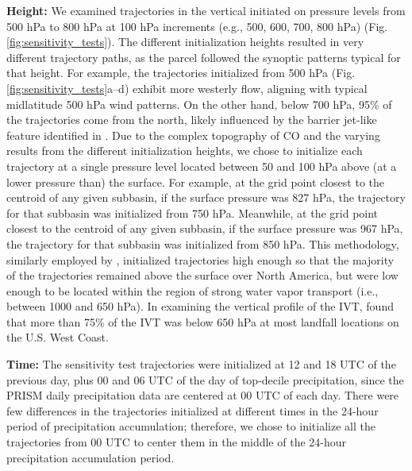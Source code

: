 \documentclass[draft]{agujournal2019}
\begin{document}
\textbf{Height:} We examined trajectories in the vertical initiated on pressure levels from 500 hPa to 800 hPa at 100 hPa increments (e.g., 500, 600, 700, 800 hPa) (Fig. \ref{fig:sensitivity_tests}). The different initialization heights resulted in very different trajectory paths, as the parcel followed the synoptic patterns typical for that height. For example, the trajectories initialized from 500 hPa (Fig. \ref{fig:sensitivity_tests}a--d) exhibit more westerly flow, aligning with typical midlatitude 500 hPa wind patterns. On the other hand, below 700 hPa, 95\% of the trajectories come from the north, likely influenced by the barrier jet-like feature identified in . Due to the complex topography of CO and the varying results from the different initialization heights, we chose to initialize each trajectory at a single pressure level located between 50 and 100 hPa above (at a lower pressure than) the surface. For example, at the grid point closest to the centroid of any given subbasin, if the surface pressure was 827 hPa, the trajectory for that subbasin was initialized from 750 hPa. Meanwhile, at the grid point closest to the centroid of any given subbasin, if the surface pressure was 967 hPa, the trajectory for that subbasin was initialized from 850 hPa. This methodology, similarly employed by , initialized trajectories high enough so that the majority of the trajectories remained above the surface over North America, but were low enough to be located within the region of strong water vapor transport (i.e., between 1000 and 650 hPa). In examining the vertical profile of the IVT,  found that more than 75\% of the IVT was below 650 hPa at most landfall locations on the U.S. West Coast. 

\textbf{Time:} The sensitivity test trajectories were initialized at 12 and 18 UTC of the previous day, plus 00 and 06 UTC of the day of top-decile precipitation, since the PRISM daily precipitation data are centered at 00 UTC of each day. There were few differences in the trajectories initialized at different times in the 24-hour period of precipitation accumulation; therefore, we chose to initialize all the trajectories from 00 UTC to center them in the middle of the 24-hour precipitation accumulation period. 
\end{document}
